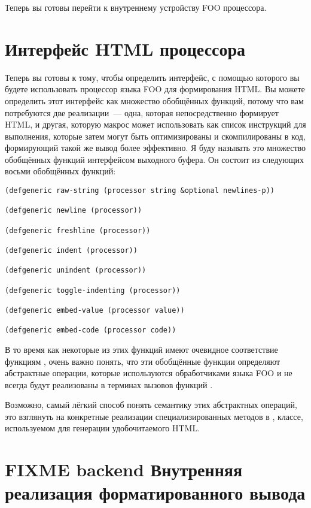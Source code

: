 Теперь вы готовы перейти к внутреннему устройству FOO процессора. 

\section{Интерфейс HTML процессора}

Теперь вы готовы к тому, чтобы определить интерфейс, с помощью которого вы будете
использовать процессор языка FOO для формирования HTML. Вы можете определить этот
интерфейс как множество обобщённых функций, потому что вам потребуются две реализации~---
одна, которая непосредственно формирует HTML, и другая, которую макрос  может
использовать как список инструкций для выполнения, которые затем могут быть оптимизированы
и скомпилированы в код, формирующий такой же вывод более эффективно. Я буду называть это
множество обобщённых функций интерфейсом выходного буфера. Он состоит из следующих восьми
обобщённых функций:

\begin{lstlisting}
(defgeneric raw-string (processor string &optional newlines-p))

(defgeneric newline (processor))

(defgeneric freshline (processor))

(defgeneric indent (processor))

(defgeneric unindent (processor))

(defgeneric toggle-indenting (processor))

(defgeneric embed-value (processor value))

(defgeneric embed-code (processor code))
\end{lstlisting}

В то время как некоторые из этих функций имеют очевидное соответствие функциям
, очень важно понять, что эти обобщённые функции определяют
абстрактные операции, которые используются обработчиками языка FOO и не всегда будут
реализованы в терминах вызовов функций .

Возможно, самый лёгкий способ понять семантику этих абстрактных операций, это взглянуть на
конкретные реализации специализированных методов в , классе,
используемом для генерации удобочитаемого HTML.

\section{FIXME backend Внутренняя реализация форматированного вывода}

